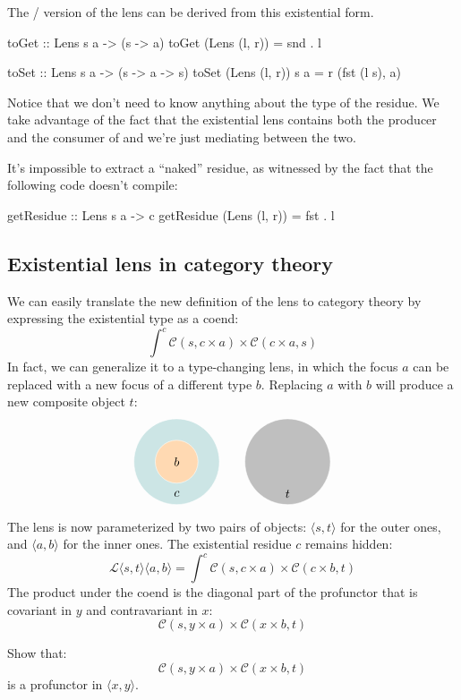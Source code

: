 \documentclass[DaoFP]{subfiles}
\begin{document}
The / version of the lens can be derived from this existential form.
\begin{haskell}
toGet :: Lens s a -> (s -> a)
toGet (Lens (l, r)) = snd . l

toSet :: Lens s a -> (s -> a -> s)
toSet (Lens (l, r)) s a = r (fst (l s), a)
\end{haskell}

Notice that we don't need to know anything about the type of the residue. We take advantage of the fact that the existential lens contains both the producer and the consumer of  and we're just mediating between the two.

It's impossible to extract a ``naked'' residue, as witnessed by the fact that the following code doesn't compile:
\begin{haskell}
getResidue :: Lens s a -> c
getResidue (Lens (l, r)) = fst . l
\end{haskell}

\subsection{Existential lens in category theory}

We can easily translate the new definition of the lens to category theory by expressing the existential type as a coend:
\[ \int^{c} \mathcal{C}(s, c \times a) \times  \mathcal{C}(c \times a, s) \]
In fact, we can generalize it to a type-changing lens, in which the focus $a$ can be replaced with a new focus of a different type $b$. Replacing $a$ with $b$ will produce a new composite object $t$:
\[
\begin{tikzpicture}
\filldraw[fill=blue!50!green!20, draw=white] (0, 0) circle (1.2);
\filldraw[fill=orange!30, draw=white] (0, 0) circle (0.6);
\node at (0, 0) {$b$};
\node at (0, -0.9) {$c$};
\end{tikzpicture}
\hspace{20pt}
\begin{tikzpicture}
\filldraw[fill=gray!50, draw=white] (0, 0) circle (1.2);
\node at (0, -0.9) {$t$};
\end{tikzpicture}
\]

The lens is now parameterized by two pairs of objects: $\langle s, t\rangle$ for the outer ones, and $ \langle a, b \rangle$ for the inner ones. The existential residue $c$ remains hidden:
\[ \mathcal{L}\langle s, t\rangle \langle a, b \rangle = \int^{c} \mathcal{C}(s, c \times a) \times  \mathcal{C}(c \times b, t) \]
The product under the coend is the diagonal part of the profunctor that is covariant in $y$ and contravariant in $x$:
\[ \mathcal{C}(s, y \times a) \times  \mathcal{C}(x \times b, t) \]
\begin{exercise}
Show that:
\[ \mathcal{C}(s, y \times a) \times  \mathcal{C}(x \times b, t) \]
is a profunctor in $\langle x, y\rangle$.
\end{exercise}
\end{document}
